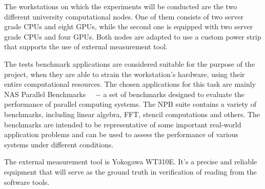 The workstations on which the experiments will be conducted are
the two different university computational nodes. One of them
consists of two server grade CPUs and eight GPUs, while the second
one is equipped with two server grade CPUs and four GPUs. Both nodes
are adapted to use a custom power strip that supports the use
of external measurement tool.

The tests benchmark applications are considered suitable for the
purpose of the project, when they are able to strain the
workstation's hardware, using their entire computational resources.
The chosen applications for this task are mainly NAS Parallel
Benchmarks~\cite{NPB}~\cite{NASA_Advanced_Supercomputing} $-$ a set
of benchmarks designed to evaluate the performance of parallel
computing systems. The NPB suite contains a variety of
benchmarks, including linear algebra, FFT, stencil computations
and others. The benchmarks are intended to be representative of
some important real-world application problems and can be used
to assess the performance of various systems under different
conditions.

The external measurement tool is Yokogawa WT310E. It's a precise
and reliable equipment that will serve as the ground truth in
verification of reading from the software tools.

